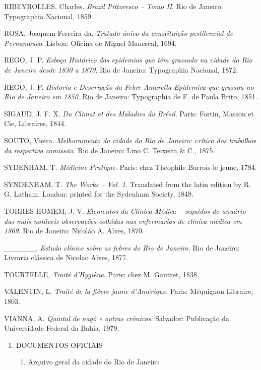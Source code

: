 RIBEYROLLES, Charles. \emph{Brazil Pittoresco -- Tomo II}. Rio de
Janeiro: Typographia Nacional, 1859.

ROSA, Joaquem Ferreira da. \emph{Tratado único da constituição
pestilencial de Pernambuco}. Lisboa: Oficina de Miguel Manescal, 1694.

REGO, J. P. \emph{Esboço Histórico das epidemias que têm grassado na
cidade do Rio de Janeiro desde 1830 a 1870}. Rio de Janeiro: Typographia
Nacional, 1872.

REGO, J. P. \emph{Historia e Descripção da Febre Amarella Epidemica que
grassou no Rio de Janeiro em 1850}. Rio de Janeiro: Typographia de F. de
Paula Brito, 1851.

SIGAUD, J. F. X. \emph{Du Climat et des Maladies du Brésil}. Paris:
Fortin, Masson et Cie, Libraires, 1844.

SOUTO, Vieira. \emph{Melhoramento da cidade do Rio de Janeiro: crítica
dos trabalhos da respectiva comissão.} Rio de Janeiro: Lino C. Teixeira
\& C., 1875.

SYDENHAM, T. \emph{Médicine Pratique}. Paris: chez Théophile Barrois le
jeune, 1784.

SYNDENHAM, T. \emph{The Works -- Vol. 1.} Translated from the latin
edition by R. G. Latham. London: printed for the Sydenham Society, 1848.

TORRES HOMEM, J. V. \emph{Elementos da Clínica Médica -- seguidos do
anuário das mais notáveis observações colhidas nas enfermarias de
clínica médica em 1869}. Rio de Janeiro: Nicoláo A. Alves, 1870.

\_\_\_\_\_\_. \emph{Estudo clínico sobre as febres do Rio de Janeiro}.
Rio de Janeiro: Livraria clássica de Nicolao Alves, 1877.

TOURTELLE, \emph{Traité d'Hygiène}. Paris: chez M. Gautret, 1838.

VALENTIN, L. \emph{Traité de la fiévre jaune d'Amérique}. Paris:
Méquignon Libraire, 1803.

VIANNA, A. \emph{Quintal de nagô e outras crônicas}. Salvador:
Publicação da Universidade Federal da Bahia, 1979.

\begin{enumerate}
\def\labelenumi{\arabic{enumi}.}
\setcounter{enumi}{1}
\item
  DOCUMENTOS OFICIAIS

  \begin{enumerate}
  \def\labelenumii{\arabic{enumii}.}
  \tightlist
  \item
    Arquivo geral da cidade do Rio de Janeiro
  \end{enumerate}
\end{enumerate}

